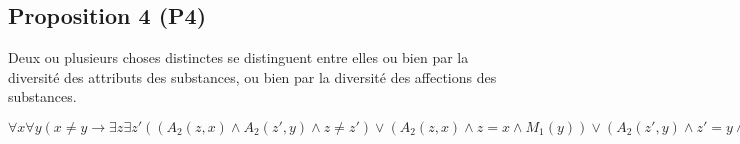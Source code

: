 \documentclass[10pt,a3paper]{article}
\begin{document}
\subsection{Proposition 4 (P4)}

\begin{center}
Deux ou plusieurs choses distinctes se distinguent entre elles ou bien par la diversité des attributs des substances, ou bien par la diversité des affections des substances.
\end{center}

\begin{center}
$\forall x \forall y (x \neq y \rightarrow \exists z \exists z' ((A_2(z,x) \land A_2(z',y) \land z \neq z') \lor (A_2(z,x) \land z = x \land M_1(y)) \lor (A_2(z',y) \land z' = y \land M_1(x)) \lor (M_1(x) \land M_1(y))))$
\end{center}
\end{document}
